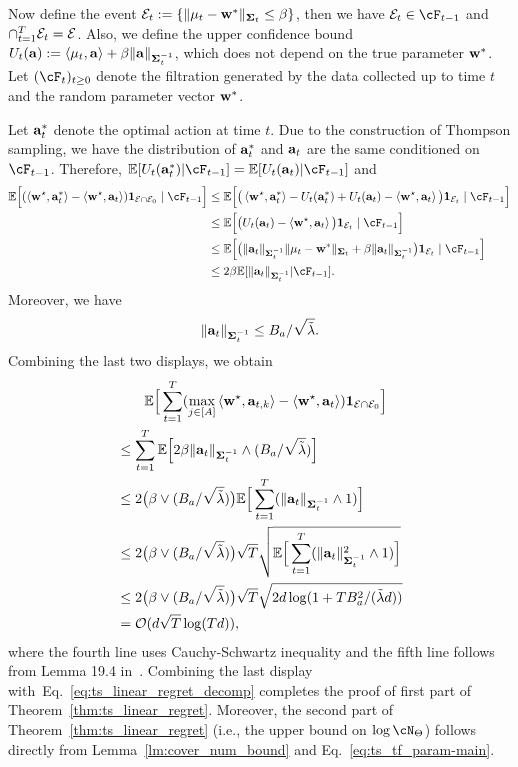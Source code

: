 Now define the event ${\mathcal E}_t:=\{\|{{\mathbf\mu}}_t-{\mathbf w}^*\|_{{{\mathbf\Sigma}}_t}\leq\beta\}$,  then  we have $\hpevent_t\in\cF_{t-1}$  and $\cap_{t=1}^T {\mathcal E}_t={\mathcal E}$. Also, we define the upper confidence bound $U_t({\mathbf a}):=\left\langle{{\mathbf\mu}}_t,{\mathbf a}\right\rangle+\beta\|{\mathbf a}\|_{{{\mathbf\Sigma}}_t^{-1}}$, which does not depend on the true parameter ${\mathbf w}^*$. Let $(\cF_{t})_{t\geq 0}$ denote the filtration generated by the data collected up to time $t$ and the random parameter vector ${\mathbf w}^*$. 

Let ${\mathbf a}_t^*$ denote the optimal action at time $t$. Due to the construction of Thompson sampling, we have the distribution of ${\mathbf a}_t^*$ and ${\mathbf a}_t$ are the same conditioned on $\cF_{t-1}$. Therefore, $\E[U_t(\ba_t^*)|\cF_{t-1}]=\E[U_t(\ba_t)|\cF_{t-1}]$ and
\begin{align*}
    \E\Big[ (\<\bw^\star,\ba_{t}^*\>-\<\bw^\star,\ba_{t}\>) \bone_{\hpevent\cap\hpevent_0}\mid\cF_{t-1}\Big]
   &\leq
\E\Big[ \big(\<\bw^\star,\ba_{t}^*\>-U_t(\ba_t^*)+U_t(\ba_t)-\<\bw^\star,\ba_{t}\>\big) \bone_{\hpevent_t}\mid\cF_{t-1}\Big]\\
    &\leq
  \E\Big[ \big(U_t(\ba_t)-\<\bw^\star,\ba_{t}\>\big) \bone_{\hpevent_t}\mid\cF_{t-1}\Big]\\
   &\leq
  \E\Big[ \big(\|\ba_t\|_{\Tpscov_t^{-1}}\|\Tpsmean_t-\bw^*\|_{\Tpscov_t} +\beta \|\ba_t\|_{\Tpscov_t^{-1}} \big)\bone_{\hpevent_t}\mid\cF_{t-1}\Big]\\
    &\leq
   2 \beta\E[\|\ba_t\|_{\Tpscov_t^{-1}}|\cF_{t-1}].
\end{align*}
Moreover, we have $$\|{\mathbf a}_t\|_{{{\mathbf\Sigma}}_t^{-1}}\leq B_a/\sqrt{\tilde\lambda}.$$ 
Combining the last two displays, we obtain
\begin{align*}
     &\qquad\mathbb{E}\Big[\sum_{t=1}^T (\max_{j\in[A]}\left\langle{\mathbf w}^\star,{\mathbf a}_{t,k}\right\rangle-\left\langle{\mathbf w}^\star,{\mathbf a}_{t}\right\rangle) {\mathbf 1}_{{\mathcal E}\cap{\mathcal E}_0}\Big]\\
    &\leq\sum_{t=1}^T \mathbb{E}\Big[2 \beta \|{\mathbf a}_t\|_{{{\mathbf\Sigma}}_t^{-1}}\wedge({B_a}/{\sqrt{\tilde\lambda}})\Big]\\
    &\leq 
    2\big(\beta\vee ({B_a}/{\sqrt{\tilde\lambda}})\big)\mathbb{E}\Big[\sum_{t=1}^T (\|{\mathbf a}_t\|_{{{\mathbf\Sigma}}_t^{-1}}\wedge1)\Big]\\
    &\leq 
    2\big(\beta\vee ({B_a}/{\sqrt{\tilde\lambda}})\big)\sqrt{T}\sqrt{\mathbb{E}\Big[\sum_{t=1}^T (\|{\mathbf a}_t\|^2_{{{\mathbf\Sigma}}_t^{-1}}\wedge1)\Big]}\\
    &\leq
    2\big(\beta\vee ({B_a}/{\sqrt{\tilde\lambda}})\big)\sqrt{T}\sqrt{2d\log(1+TB_a^2/(\tilde\lambda d))}\\
    &= \mathcal{O}( d\sqrt{T}\log(Td)),
\end{align*}
where the  fourth line uses  Cauchy-Schwartz inequality and the fifth line follows from Lemma 19.4 in~\cite{lattimore2020bandit}. Combining the last display with~Eq.~\eqref{eq:ts_linear_regret_decomp} completes the proof of first part of Theorem~\ref{thm:ts_linear_regret}. Moreover, the second part of Theorem~\ref{thm:ts_linear_regret}  (i.e., the upper bound on $\log\cN_{\tfparspace}$) follows directly from Lemma~\ref{lm:cover_num_bound} and Eq.~\eqref{eq:ts_tf_param-main}. 








